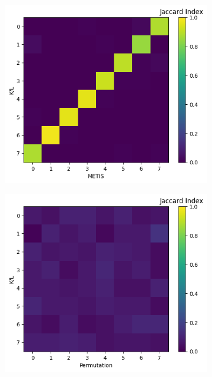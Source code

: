 \begin{figure}[H]
\begin{subfigure}[t]{1\textwidth}
    \end{subfigure}
    \begin{subfigure}[t]{0.33\textwidth}
        \caption{}
        \includegraphics[width=\textwidth]{./extended_plots/argmins_jaccard.png}        
    \end{subfigure}
    \begin{subfigure}[t]{0.33\textwidth}
        \caption{}
        \includegraphics[width=\textwidth]{./extended_plots/random_jaccard.png}        

\end{subfigure}
\end{figure}
